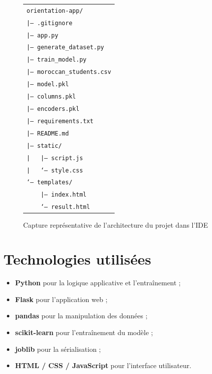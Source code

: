 \documentclass[12pt,a4paper]{report}
\begin{document}
\begin{figure}[H]
\centering
\begin{tcolorbox}[colback=black!3,colframe=mainblue,width=0.95\textwidth]
\small
\begin{tabular}{l}
\texttt{orientation-app/} \\
\texttt{|-- .gitignore} \\
\texttt{|-- app.py} \\
\texttt{|-- generate\_dataset.py} \\
\texttt{|-- train\_model.py} \\
\texttt{|-- moroccan\_students.csv} \\
\texttt{|-- model.pkl} \\
\texttt{|-- columns.pkl} \\
\texttt{|-- encoders.pkl} \\
\texttt{|-- requirements.txt} \\
\texttt{|-- README.md} \\
\texttt{|-- static/} \\
\texttt{| \ \ |-- script.js} \\
\texttt{| \ \ `-- style.css} \\
\texttt{`-- templates/} \\
\texttt{\ \ \ \ |-- index.html} \\
\texttt{\ \ \ \ `-- result.html}
\end{tabular}
\end{tcolorbox}
\caption{Capture représentative de l'architecture du projet dans l'IDE}
\end{figure}

\section{Technologies utilisées}
\begin{itemize}[label=--]
    \item \textbf{Python} pour la logique applicative et l'entraînement ;
    \item \textbf{Flask} pour l'application web ;
    \item \textbf{pandas} pour la manipulation des données ;
    \item \textbf{scikit-learn} pour l'entraînement du modèle ;
    \item \textbf{joblib} pour la sérialisation ;
    \item \textbf{HTML / CSS / JavaScript} pour l'interface utilisateur.
\end{itemize}
\end{document}
